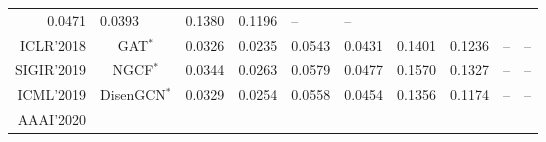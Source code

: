 \documentclass[sigconf,authorversion]{acmart}
\begin{document}
\begin{table*}[!t]
\begin{tabular}{rcllllllll}
  0.0471 &
  \multicolumn{1}{l|}{0.0393} &
  0.1380 &
  \multicolumn{1}{l|}{0.1196} &
  -- &
  -- \\
\multicolumn{1}{r|}{ICLR'2018} &
  \multicolumn{1}{c|}{GAT$^\ast$} &
  0.0326 &
  \multicolumn{1}{l|}{0.0235} &
  0.0543 &
  \multicolumn{1}{l|}{0.0431} &
  0.1401 &
  \multicolumn{1}{l|}{0.1236} &
  -- &
  -- \\
\multicolumn{1}{r|}{SIGIR'2019} &
  \multicolumn{1}{c|}{NGCF$^\ast$} &
  0.0344 &
  \multicolumn{1}{l|}{0.0263} &
  0.0579 &
  \multicolumn{1}{l|}{0.0477} &
  0.1570 &
  \multicolumn{1}{l|}{0.1327} &
  -- &
  -- \\
\multicolumn{1}{r|}{ICML'2019} &
  \multicolumn{1}{c|}{DisenGCN$^\ast$} &
  0.0329 &
  \multicolumn{1}{l|}{0.0254} &
  0.0558 &
  \multicolumn{1}{l|}{0.0454} &
  0.1356 &
  \multicolumn{1}{l|}{0.1174} &
  -- &
  -- \\
\multicolumn{1}{r|}{AAAI'2020} &      


\end{tabular}
\end{table*}
\end{document}
